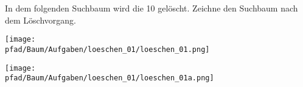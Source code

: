 \question[2]
In dem folgenden Suchbaum wird die 10 gelöscht. Zeichne den
Suchbaum nach dem Löschvorgang.

\texttt{[image: \\pfad/Baum/Aufgaben/loeschen\_01/loeschen\_01.png]}
\begin{solutionbox}{7cm}

\texttt{[image: \\pfad/Baum/Aufgaben/loeschen\_01/loeschen\_01a.png]}
\end{solutionbox}
